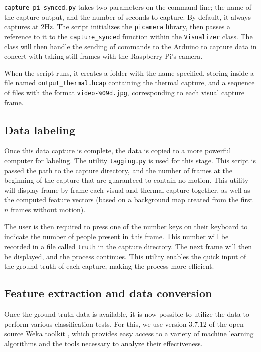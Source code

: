 \documentclass[../thesis/thesis.tex]{subfiles}
\begin{document}
\texttt{capture\_pi\_synced.py} takes two parameters on the command line; the name of the capture output, and the number of seconds to capture. By default, it always captures at 2Hz. The script initializes the \texttt{picamera} library, then passes a reference to it to the \texttt{capture\_synced} function within the \texttt{Visualizer} class. The class will then handle the sending of commands to the Arduino to capture data in concert with taking still frames with the Raspberry Pi's camera.

When the script runs, it creates a folder with the name specified, storing inside a file named \texttt{output\_thermal.hcap} containing the thermal capture, and a sequence of files with the format \texttt{video-\%09d.jpg}, corresponding to each visual capture frame.

\subsection{Data labeling}
Once this data capture is complete, the data is copied to a more powerful computer for labeling. The utility \texttt{tagging.py} is used for this stage. This script is passed the path to the capture directory, and the number of frames at the beginning of the capture that are guaranteed to contain no motion. This utility will display frame by frame each visual and thermal capture together, as well as the computed feature vectors (based on a background map created from the first $n$ frames without motion).

The user is then required to press one of the number keys on their keyboard to indicate the number of people present in this frame. This number will be recorded in a file called \texttt{truth} in the capture directory. The next frame will then be displayed, and the process continues. This utility enables the quick input of the ground truth of each capture, making the process more efficient.

\subsection{Feature extraction and data conversion}

Once the ground truth data is available, it is now possible to utilize the data to perform various classification tests. For this, we use version 3.7.12 of the open-source Weka toolkit \cite{Weka}, which provides easy access to a variety of machine learning algorithms and the tools necessary to analyze their effectiveness.
\end{document}
